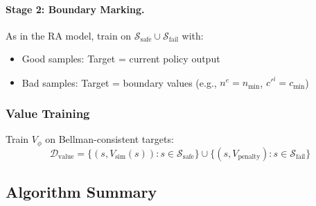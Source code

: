 \paragraph{Stage 2: Boundary Marking.}
As in the RA model, train on $\mathcal{S}_{\text{safe}} \cup \mathcal{S}_{\text{fail}}$ with:
\begin{itemize}
    \item Good samples: Target = current policy output
    \item Bad samples: Target = boundary values (e.g., $n^e = n_{\min}$, $c'^i = c_{\min}$)
\end{itemize}

\subsubsection{Value Training}
Train $V_\phi$ on Bellman-consistent targets:
\begin{equation}
    \mathcal{D}_{\text{value}} = \{(s, V_{\text{sim}}(s)) : s \in \mathcal{S}_{\text{safe}}\} \cup \{(s, V_{\text{penalty}}) : s \in \mathcal{S}_{\text{fail}}\}
\end{equation}


\subsection{Algorithm Summary}

